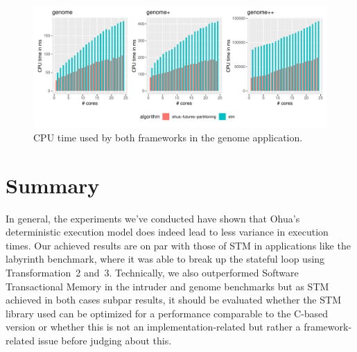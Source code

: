 \begin{figure}
    \centering
    \includegraphics[width=\textwidth,keepaspectratio]{gfx/results/cpu_genome_comb}
    \caption{CPU time used by both frameworks in the genome application.}%
    \label{fig:evaluation:genome-cpu}
\end{figure}


\section{Summary}%
\label{sec:evaluation:summary}

In general, the experiments we've conducted have shown that Ohua's deterministic execution model does indeed lead to less variance in execution times. %
Our achieved results are on par with those of STM in applications like the labyrinth benchmark, where it was able to break up the stateful loop using Transformation~2 and~3.
Technically, we also outperformed Software Transactional Memory in the intruder and genome benchmarks but as STM achieved in both cases subpar results, it should be evaluated whether the STM library used can be optimized for a performance comparable to the C-based version or whether this is not an implementation-related but rather a framework-related issue before judging about this.

